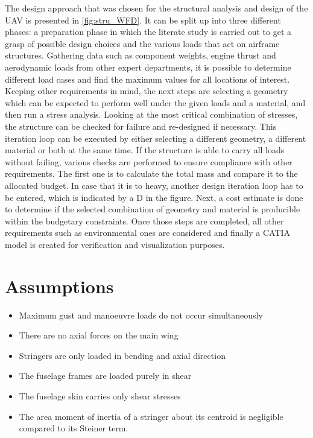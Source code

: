 The design approach that was chosen for the structural analysis and design of the UAV is presented in \autoref{fig:stru_WFD}. It can be split up into three different phases: a preparation phase in which the literate study is carried out to get a grasp of possible design choices and the various loads that act on airframe structures. Gathering data such as component weights, engine thrust and aerodynamic loads from other expert departments, it is possible to determine different load cases and find the maximum values for all locations of interest. Keeping other requirements in mind, the next steps are selecting a geometry which can be expected to perform well under the given loads and a material, and then run a stress analysis. Looking at the most critical combination of stresses, the structure can be checked for failure and re-designed if necessary. This iteration loop can be executed by either selecting a different geometry, a different material or both at the same time. If the structure is able to carry all loads without failing, various checks are performed to ensure compliance with other requirements. The first one is to calculate the total mass and compare it to the allocated budget. In case that it is to heavy, another design iteration loop has to be entered, which is indicated by a D in the figure. Next, a cost estimate is done to determine if the selected combination of geometry and material is producible within the budgetary constraints. Once those steps are completed, all other requirements such as environmental ones are considered and finally a CATIA model is created for verification and visualization purposes.

\section{Assumptions}
\label{sec:assu_stru}

\begin{itemize}
    \item Maximum gust and manoeuvre loads do not occur simultaneously
    \item There are no axial forces on the main wing
    \item Stringers are only loaded in bending and axial direction
    \item The fuselage frames are loaded purely in shear
    \item The fuselage skin carries only shear stresses
    \item The area moment of inertia of a stringer about its centroid is negligible compared to its Steiner term.
\end{itemize}

